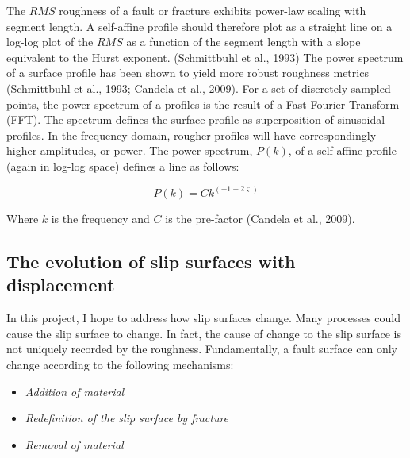 \documentclass[12pt,a4paper]{article}
\begin{document}
	The $RMS$ roughness of a fault or fracture exhibits power-law scaling with segment length. A self-affine profile should therefore plot as a straight line on a log-log plot of the $RMS$ as a function of the segment length with a slope equivalent to the Hurst exponent. (Schmittbuhl et al., 1993)
The power spectrum of a surface profile has been shown to yield more robust roughness metrics (Schmittbuhl et al., 1993; Candela et al., 2009). For a set of discretely sampled points, the power spectrum of a profiles is the result of a Fast Fourier Transform (FFT). The spectrum defines the surface profile as superposition of sinusoidal profiles.   In the frequency domain, rougher profiles will have correspondingly higher amplitudes, or power. The power spectrum, $P(k)$, of a self-affine profile (again in log-log space) defines a line as follows:

\begin{equation}
P(k) = Ck^{(-1-2\varsigma)}
\end{equation}

Where $k$ is the frequency and $C$ is the pre-factor (Candela et al., 2009). 

\subsection{The evolution of slip surfaces with displacement}

In this project, I hope to address how slip surfaces change. Many processes could cause the slip surface to change.   In fact, the cause of change to the slip surface is not uniquely recorded by the roughness. Fundamentally, a fault surface can only change according to the following mechanisms:
\begin{itemize}
	\item[] \textit{Addition of material}
	\item[] \textit{Redefinition of the slip surface by fracture}
	\item[] \textit{Removal of material}
\end{itemize}
	
\end{document}
